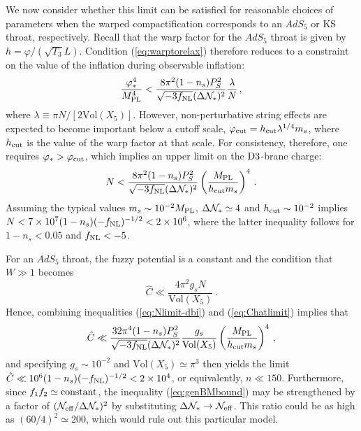 We now consider whether this limit can be satisfied for reasonable choices 
of parameters when the warped compactification corresponds to 
an $AdS_5$ or KS throat, respectively. Recall that the warp 
factor for the $AdS_5$ throat is given by $h=\varphi/(\sqrt{T_3}L)$.  
Condition (\ref{eq:warptorelax}) therefore reduces to a constraint on the 
value of the inflation during observable inflation: 
% 
\begin{equation}
\label{eq:phivalue-dbi}
\frac{\varphi_*^4}{M_{\mathrm{PL}}^4} < 
\frac{8\pi^2 (1-n_s)P_S^2}{\sqrt{-3f_{\mathrm{NL}}} ( \Delta {\cal{N}}_*)^2} 
\frac{\lambda}{N} \,,
\end{equation}
%  
where $\lambda \equiv \pi N/[2 \mathrm{Vol}(X_5)]$. 
However, non-perturbative string effects are expected to become 
important below a cutoff scale, $\varphi_{\rm cut} = 
h_{\rm cut} \lambda^{1/4} m_s$, where $h_{\rm cut}$ is the value of the 
warp factor at that scale. For consistency, therefore, one requires 
$\varphi_*>\varphi_{\rm cut}$, which implies an upper limit on the 
${\rm D3}$-brane charge: 
% 
\begin{equation}
\label{eq:Nlimit-dbi}
N< \frac{8\pi^2 (1-n_s)P_S^2}{\sqrt{-3f_{\mathrm{NL}}} ( \Delta {\cal{N}}_*)^2}
\left( \frac{M_{\mathrm{PL}}}{h_{\rm cut}m_s} \right)^4  \,.
\end{equation}
% 
Assuming the typical values $m_s \sim 10^{-2}M_{\mathrm{PL}}$, 
$\Delta {\cal{N}}_* \simeq 4$ and 
$h_{\rm cut} \sim 10^{-2}$ implies  
$N < 7 \times 10^7 (1-n_s)(-f_{\mathrm{NL}})^{-1/2} < 2\times 10^6$, where 
the latter inequality follows for $1-n_s <0.05$ and $f_{\mathrm{NL}} <-5$. 


For an $AdS_5$ throat, the fuzzy potential 
is a constant and the condition that $W \gg 1$ becomes 
% 
\begin{equation}
\label{eq:Chatlimit}
\hat{C} \ll \frac{4\pi^2g_sN}{\mathrm{Vol}(X_5)} \,.
\end{equation}
% 
Hence, combining inequalities 
(\ref{eq:Nlimit-dbi}) and (\ref{eq:Chatlimit}) implies that
%  
\begin{equation}
\label{eq:nlimit-dbi}
\hat{C} \ll 
\frac{32 \pi^4 (1-n_s)P_S^2}{\sqrt{-3f_{\mathrm{NL}}} ( \Delta {\cal{N}}_*)^2}
\frac{g_s}{\mathrm{Vol} (X_5) }
\left( \frac{M_{\mathrm{PL}}}{h_{\rm cut}m_s} \right)^4  \,,
\end{equation}
% 
and specifying $g_s \sim 10^{-2}$ and 
$\mathrm{Vol}(X_5) \simeq \pi^3$ then yields the limit  
$\hat{C} \ll 10^{6} (1-n_s)(-f_{\mathrm{NL}})^{-1/2} < 2 \times 10^4$, or equivalently,  
$n \ll 150$. Furthermore, since $f_1f_2 \simeq {\rm constant}$, 
the inequality (\ref{eq:genBMbound}) may be strengthened by a 
factor of $(   {\cal{N}}_{\mathrm{eff}} /\Delta {\cal{N}}_*)^2$ by 
substituting 
$\Delta {\cal{N}}_* \rightarrow {\cal{N}}_{\mathrm{eff}}$. This ratio 
could be as 
high as $(60/4)^2 \simeq 200 $, which would rule out this particular
model. 


